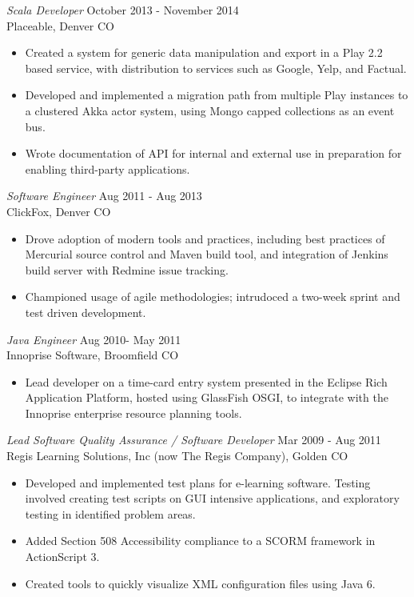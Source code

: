 \documentclass[line,margin]{res}
\begin{document}
\begin{resume}
{\sl Scala Developer} \hfill October 2013 - November 2014\\
Placeable, Denver CO
\begin{itemize} 
\item Created a system for generic data manipulation and export
in a Play 2.2 based service, with distribution to services such
as Google, Yelp, and Factual.
\item Developed and implemented a migration path from multiple
Play instances to a clustered Akka actor system, using Mongo
capped collections as an event bus.
\item Wrote documentation of API for internal and external use
in preparation for enabling third-party applications.
\end{itemize}

{\sl Software Engineer} \hfill Aug 2011 - Aug 2013 \\
     ClickFox, Denver CO
\begin{itemize}
\item Drove adoption of modern tools and practices, including
best practices of Mercurial source control and Maven build tool,
and integration of Jenkins build server with Redmine issue
tracking.
\item Championed usage of agile methodologies; intrudoced a
two-week sprint and test driven development.
\end{itemize}
 \pagebreak
 
{\sl Java Engineer} \hfill          Aug 2010- May 2011 \\
                Innoprise Software, Broomfield CO
\begin{itemize} 
\item Lead developer on a time-card entry system presented in
the Eclipse Rich Application Platform, hosted using GlassFish
OSGI, to integrate with the Innoprise enterprise resource
planning tools.
\end{itemize} 	 
	    
{\sl Lead Software Quality Assurance / Software Developer}
\hfill Mar 2009 - Aug 2011 \\
Regis Learning Solutions, Inc (now The Regis Company), Golden CO\begin{itemize} 
\item Developed and implemented test plans for e-learning
software. Testing involved creating test scripts on GUI
intensive applications, and exploratory testing in identified
problem areas.
\item Added Section 508 Accessibility compliance to a SCORM
framework in ActionScript 3.
\item Created tools to quickly visualize XML configuration files
using Java 6.
    \end{itemize} 


\end{resume}
\end{document}
